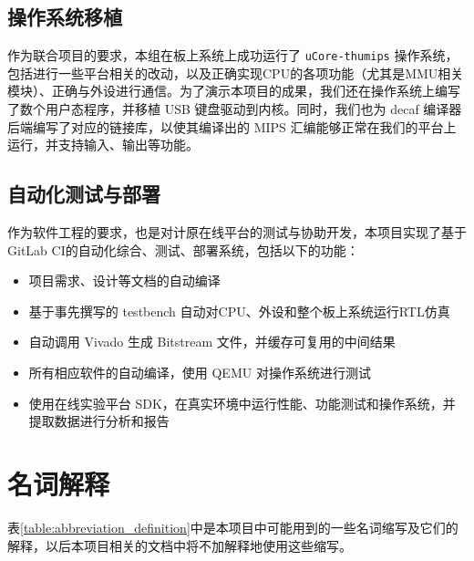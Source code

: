 \subsection{操作系统移植}

作为联合项目的要求，本组在板上系统上成功运行了 \texttt{uCore-thumips} 操作系统，包括进行一些平台相关的改动，以及正确实现CPU的各项功能（尤其是MMU相关模块）、正确与外设进行通信。为了演示本项目的成果，我们还在操作系统上编写了数个用户态程序，并移植 USB 键盘驱动到内核。同时，我们也为 decaf 编译器后端编写了对应的链接库，以使其编译出的 MIPS 汇编能够正常在我们的平台上运行，并支持输入、输出等功能。

\subsection{自动化测试与部署}

作为软件工程的要求，也是对计原在线平台的测试与协助开发，本项目实现了基于GitLab CI的自动化综合、测试、部署系统，包括以下的功能：

\begin{itemize}

    \item 项目需求、设计等文档的自动编译
    \item 基于事先撰写的 testbench 自动对CPU、外设和整个板上系统运行RTL仿真
    \item 自动调用 Vivado 生成 Bitstream 文件，并缓存可复用的中间结果
    \item 所有相应软件的自动编译，使用 QEMU 对操作系统进行测试
    \item 使用在线实验平台 SDK，在真实环境中运行性能、功能测试和操作系统，并提取数据进行分析和报告

\end{itemize}

\section{名词解释}

表\ref{table:abbreviation_definition}中是本项目中可能用到的一些名词缩写及它们的解释，以后本项目相关的文档中将不加解释地使用这些缩写。

